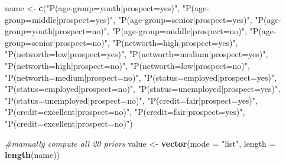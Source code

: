 \documentclass[]{article}
\newenvironment{Shaded}{\begin{snugshade}}{\end{snugshade}}
\newcommand{\KeywordTok}[1]{\textcolor[rgb]{0.13,0.29,0.53}{\textbf{#1}}}
\newcommand{\DataTypeTok}[1]{\textcolor[rgb]{0.13,0.29,0.53}{#1}}
\newcommand{\StringTok}[1]{\textcolor[rgb]{0.31,0.60,0.02}{#1}}
\newcommand{\CommentTok}[1]{\textcolor[rgb]{0.56,0.35,0.01}{\textit{#1}}}
\newcommand{\NormalTok}[1]{#1}
\begin{document}
\begin{Shaded}
\begin{Highlighting}[]
\NormalTok{name <-}\StringTok{ }\KeywordTok{c}\NormalTok{(}\StringTok{"P(age-group=youth|prospect=yes)"}\NormalTok{,}
\StringTok{"P(age-group=middle|prospect=yes)"}\NormalTok{,}
\StringTok{"P(age-group=senior|prospect=yes)"}\NormalTok{,}
\StringTok{"P(age-group=youth|prospect=no)"}\NormalTok{,}
\StringTok{"P(age-group=middle|prospect=no)"}\NormalTok{,}
\StringTok{"P(age-group=senior|prospect=no)"}\NormalTok{,}
\StringTok{"P(networth=high|prospect=yes)"}\NormalTok{,}
\StringTok{"P(networth=low|prospect=yes)"}\NormalTok{,}
\StringTok{"P(networth=medium|prospect=yes)"}\NormalTok{,}
\StringTok{"P(networth=high|prospect=no)"}\NormalTok{,}
\StringTok{"P(networth=low|prospect=no)"}\NormalTok{,}
\StringTok{"P(networth=medium|prospect=no)"}\NormalTok{,}
\StringTok{"P(status=employed|prospect=yes)"}\NormalTok{,}
\StringTok{"P(status=employed|prospect=no)"}\NormalTok{,}
\StringTok{"P(status=unemployed|prospect=yes)"}\NormalTok{,}
\StringTok{"P(status=unemployed|prospect=no)"}\NormalTok{,}
\StringTok{"P(credit=fair|prospect=yes)"}\NormalTok{,}
\StringTok{"P(credit=excellent|prospect=no)"}\NormalTok{,}
\StringTok{"P(credit=fair|prospect=yes)"}\NormalTok{,}
\StringTok{"P(credit=excellent|prospect=no)"}\NormalTok{)}

\CommentTok{#manually compute all 20 priors}
\NormalTok{value <-}\StringTok{ }\KeywordTok{vector}\NormalTok{(}\DataTypeTok{mode =} \StringTok{"list"}\NormalTok{, }\DataTypeTok{length =} \KeywordTok{length}\NormalTok{(name))}


\end{Highlighting}
\end{Shaded}
\end{document}
